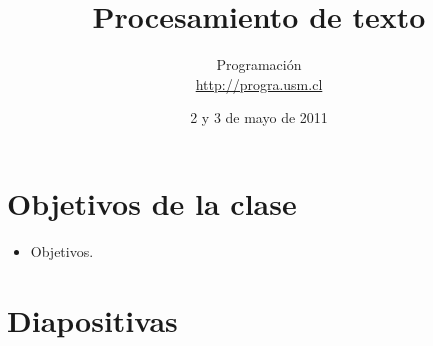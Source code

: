 \documentclass[10pt]{article}
\title{Procesamiento de texto}
\author{Programación \\ \url{http://progra.usm.cl}}
\date{2 y 3 de mayo de 2011}
\begin{document}
  \maketitle

  \section*{Objetivos de la clase}
  \begin{itemize}
    \item Objetivos.
  \end{itemize}

  \section*{Diapositivas}
\end{document}
